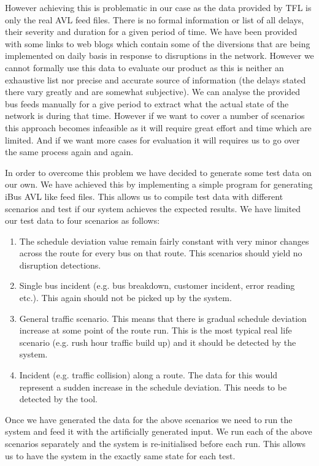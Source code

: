 However achieving this is problematic in our case as the data provided by TFL is only the real AVL feed files.
There is no formal information or list of all delays, their severity and duration for a given period of time. We have been provided with some links to web blogs which contain some of the diversions that are being implemented on daily basis in response to disruptions in the network. However we cannot formally use this data to evaluate our product as this is neither an exhaustive list nor precise and accurate source of information (the delays stated there vary greatly and are somewhat subjective). We can analyse the provided bus feeds manually for a give period to extract what the actual state of the network is during that time. However if we want to cover a number of scenarios this approach becomes infeasible as it will require great effort and time which are limited. And if we want more cases for evaluation it will requires us to go over the same process again and again.

In order to overcome this problem we have decided to generate some test data on our own. We have achieved this by implementing a simple program for generating iBus AVL like feed files. This allows us to compile test data with different scenarios and test if our system achieves the expected results. We have limited our test data to four scenarios as follows:
\begin{enumerate}
	\item The schedule deviation value remain fairly constant with very minor changes across the route for every bus on that route. This scenarios should yield no disruption detections.
	\item Single bus incident (e.g. bus breakdown, customer incident, error reading etc.). This again should not be picked up by the system.
	\item General traffic scenario. This means that there is gradual schedule deviation increase at some point of the route run. This is the most typical real life scenario (e.g. rush hour traffic build up) and it should be detected by the system.
	\item Incident (e.g. traffic collision) along a route. The data for this would represent a sudden increase in the schedule deviation. This needs to be detected by the tool.
\end{enumerate}

Once we have generated the data for the above scenarios we need to run the system and feed it with the artificially generated input. We run each of the above scenarios separately and the system is re-initialised before each run. This allows us to have the system in the exactly same state for each test.

